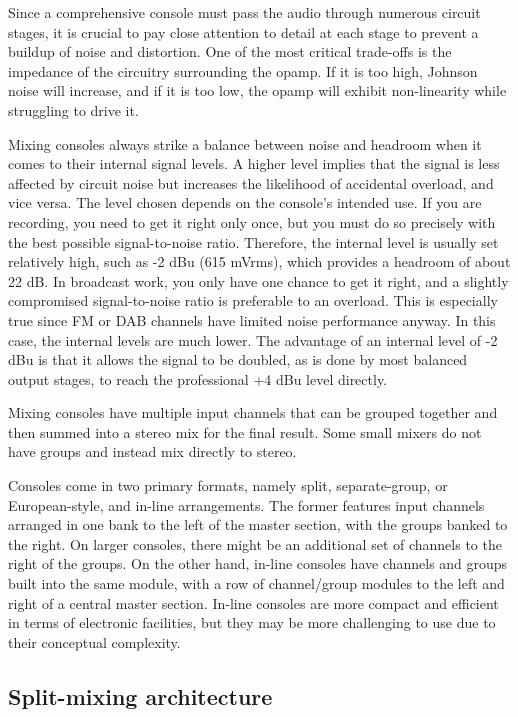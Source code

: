 Since a comprehensive console must pass the audio through numerous circuit
stages, it is crucial to pay close attention to detail at each stage to prevent
a buildup of noise and distortion. One of the most critical trade-offs is the
impedance of the circuitry surrounding the opamp. If it is too high, Johnson
noise will increase, and if it is too low, the opamp will exhibit non-linearity
while struggling to drive it.

Mixing consoles always strike a balance between noise and headroom when it
comes to their internal signal levels. A higher level implies that the signal
is less affected by circuit noise but increases the likelihood of accidental
overload, and vice versa. The level chosen depends on the console's intended
use. If you are recording, you need to get it right only once, but you must do
so precisely with the best possible signal-to-noise ratio. Therefore, the
internal level is usually set relatively high, such as -2 dBu (615 mVrms),
which provides a headroom of about 22 dB. In broadcast work, you only have one
chance to get it right, and a slightly compromised signal-to-noise ratio is
preferable to an overload. This is especially true since FM or DAB channels
have limited noise performance anyway. In this case, the internal levels are
much lower. The advantage of an internal level of -2 dBu is that it allows the
signal to be doubled, as is done by most balanced output stages, to reach the
professional +4 dBu level directly.

Mixing consoles have multiple input channels that can be grouped together and
then summed into a stereo mix for the final result. Some small mixers do not
have groups and instead mix directly to stereo.

Consoles come in two primary formats, namely split, separate-group, or
European-style, and in-line arrangements. The former features input channels
arranged in one bank to the left of the master section, with the groups banked
to the right. On larger consoles, there might be an additional set of channels
to the right of the groups. On the other hand, in-line consoles have channels
and groups built into the same module, with a row of channel/group modules to
the left and right of a central master section. In-line consoles are more
compact and efficient in terms of electronic facilities, but they may be more
challenging to use due to their conceptual complexity.

\subsection{Split-mixing architecture}

